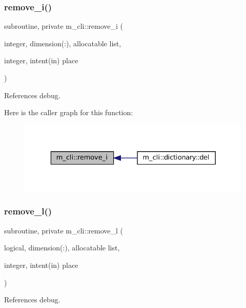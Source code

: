 \subsubsection{\texorpdfstring{remove\+\_\+i()}{remove\_i()}}
{\footnotesize\ttfamily subroutine, private m\+\_\+cli\+::remove\+\_\+i (\begin{DoxyParamCaption}\item[{integer, dimension(\+:), allocatable}]{list,  }\item[{integer, intent(in)}]{place }\end{DoxyParamCaption})\hspace{0.3cm}{\ttfamily [private]}}



References debug.

Here is the caller graph for this function\+:\nopagebreak
\begin{figure}[H]
\begin{center}
\leavevmode
\includegraphics[width=329pt]{namespacem__cli_afa08d3d87184a6dd68a124231e536c93_icgraph}
\end{center}
\end{figure}
\mbox{\label{namespacem__cli_a9c86f0f52ce71f14e774fd21f0686cf6}} 
\subsubsection{\texorpdfstring{remove\+\_\+l()}{remove\_l()}}
{\footnotesize\ttfamily subroutine, private m\+\_\+cli\+::remove\+\_\+l (\begin{DoxyParamCaption}\item[{logical, dimension(\+:), allocatable}]{list,  }\item[{integer, intent(in)}]{place }\end{DoxyParamCaption})\hspace{0.3cm}{\ttfamily [private]}}



References debug.

